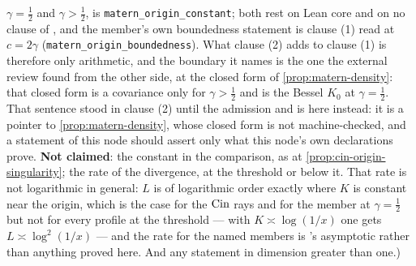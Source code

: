 \begin{corollary}
{$\gamma = \tfrac12$ and $\gamma > \tfrac12$, is \texttt{matern\_origin\_constant}; both rest on
Lean core and on no clause of , and the member's own boundedness statement is clause
(1) read at $c = 2\gamma$ (\texttt{matern\_origin\_boundedness}). What clause (2) adds to clause
(1) is therefore only arithmetic, and the boundary it names is the one the external review found
from the other side, at the closed form of \ref{prop:matern-density}: that closed form is a
\Matern{} covariance only for $\gamma > \tfrac12$ and is the Bessel $K_0$ at $\gamma = \tfrac12$.
That sentence stood in clause (2) until the admission and is here instead: it is a pointer to
\ref{prop:matern-density}, whose closed form is not machine-checked, and a statement of this node
should assert only what this node's own declarations prove.
\textbf{Not claimed}: the constant in the comparison, as at \ref{prop:cin-origin-singularity};
the rate of the divergence, at the threshold or below it. That rate is not logarithmic in general:
$L$ is of logarithmic order exactly where $K$ is constant near the origin, which is the case for
the $\operatorname{Cin}$ rays and for the \Matern{} member at $\gamma = \tfrac12$ but not for every profile at
the threshold --- with $K \asymp \log(1/x)$ one gets $L \asymp \log^2(1/x)$ --- and the rate for
the named members is 's asymptotic rather than anything proved here. And any statement
in dimension greater than one.)}
\end{corollary}

